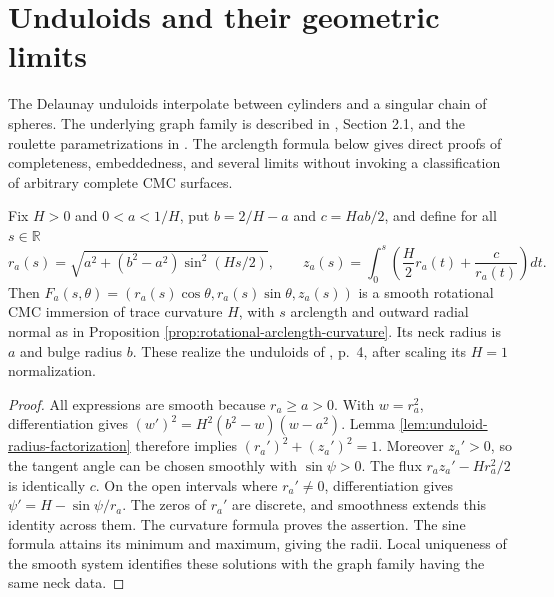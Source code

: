 \chapter{Unduloids and their geometric limits}\label{sec:unduloid-examples}
The Delaunay unduloids interpolate between cylinders and a singular chain of spheres. The underlying graph family is described in \cite{Maz02}, Section 2.1, and the roulette parametrizations in \cite{BBM13}. The arclength formula below gives direct proofs of completeness, embeddedness, and several limits without invoking a classification of arbitrary complete CMC surfaces.

\begin{theorem}\label{thm:explicit-unduloid-construction}
Fix $H>0$ and $0<a<1/H$, put $b=2/H-a$ and $c=Hab/2$, and define for all $s\in\mathbb R$
\[
 r_a(s)=\sqrt{a^2+(b^2-a^2)\sin^2(Hs/2)},\qquad
 z_a(s)=\int_0^s\left(\frac H2r_a(t)+\frac c{r_a(t)}\right)dt.
\]
Then $F_a(s,\theta)=(r_a(s)\cos\theta,r_a(s)\sin\theta,z_a(s))$ is a smooth rotational CMC immersion of trace curvature $H$, with $s$ arclength and outward radial normal as in Proposition \ref{prop:rotational-arclength-curvature}. Its neck radius is $a$ and bulge radius $b$. These realize the unduloids of \cite{Maz02}, p.~4, after scaling its $H=1$ normalization.
\end{theorem}
\begin{proof}
All expressions are smooth because $r_a\ge a>0$. With $w=r_a^2$, differentiation gives $(w')^2=H^2(b^2-w)(w-a^2)$. Lemma \ref{lem:unduloid-radius-factorization} therefore implies $(r_a')^2+(z_a')^2=1$. Moreover $z_a'>0$, so the tangent angle can be chosen smoothly with $\sin\psi>0$. The flux $r_a z_a'-Hr_a^2/2$ is identically $c$. On the open intervals where $r_a'\ne0$, differentiation gives $\psi'=H-\sin\psi/r_a$. The zeros of $r_a'$ are discrete, and smoothness extends this identity across them. The curvature formula proves the assertion. The sine formula attains its minimum and maximum, giving the radii. Local uniqueness of the smooth system identifies these solutions with the graph family having the same neck data.
\end{proof}

